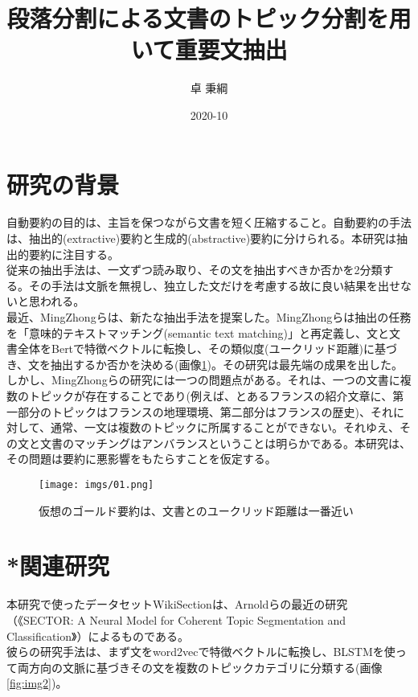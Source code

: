 \documentclass[a4paper]{article}
\title{段落分割による文書のトピック分割を用いて重要文抽出}
\date{2020-10}
\author{卓 秉綱}
\begin{document}
\maketitle

\section{研究の背景}

自動要約の目的は、主旨を保つながら文書を短く圧縮すること。自動要約の手法は、抽出的(extractive)要約と生成的(abstractive)要約に分けられる。本研究は抽出的要約に注目する。\\

従来の抽出手法は、一文ずつ読み取り、その文を抽出すべきか否かを2分類する。その手法は文脈を無視し、独立した文だけを考慮する故に良い結果を出せないと思われる。\\

最近、MingZhongらは、新たな抽出手法を提案した。MingZhongらは抽出の任務を「意味的テキストマッチング(semantic text matching)」と再定義し、文と文書全体をBertで特徴ベクトルに転換し、その類似度(ユークリッド距離)に基づき、文を抽出するか否かを決める(画像\ref{fig:img1})。その研究は最先端の成果を出した。\\

しかし、MingZhongらの研究には一つの問題点がある。それは、一つの文書に複数のトピックが存在することであり(例えば、とあるフランスの紹介文章に、第一部分のトピックはフランスの地理環境、第二部分はフランスの歴史)、それに対して、通常、一文は複数のトピックに所属することができない。それゆえ、その文と文書のマッチングはアンバランスということは明らかである。本研究は、その問題は要約に悪影響をもたらすことを仮定する。\\

\begin{figure}
  \texttt{[image: imgs/01.png]}
  \caption{仮想のゴールド要約は、文書とのユークリッド距離は一番近い}
  \label{fig:img1}
\end{figure}

\section{*関連研究}

本研究で使ったデータセットWikiSectionは、Arnoldらの最近の研究（《SECTOR: A Neural Model for Coherent Topic Segmentation and Classification》）によるものである。\\

彼らの研究手法は、まず文をword2vecで特徴ベクトルに転換し、BLSTMを使って両方向の文脈に基づきその文を複数のトピックカテゴリに分類する(画像\ref{fig:img2})。\\
\end{document}
